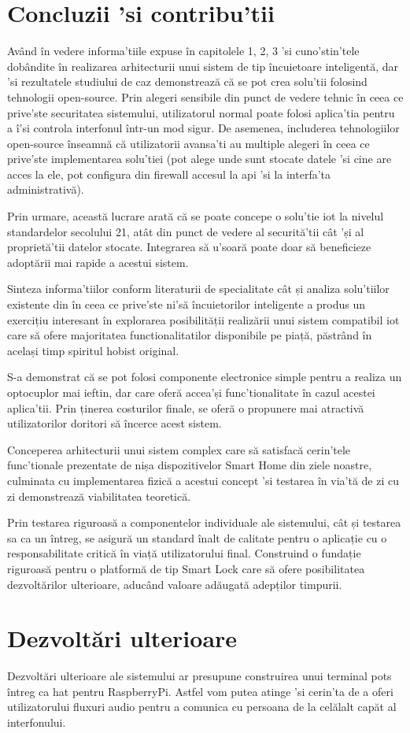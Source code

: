 \section{Concluzii 'si contribu'tii}

Având în vedere informa'tiile expuse în capitolele 1, 2, 3 'si cuno'stin'tele dobândite în realizarea arhitecturii unui sistem de tip încuietoare inteligentă, dar 'si rezultatele studiului de caz demonstrează că se pot crea solu'tii folosind tehnologii open-source. Prin alegeri sensibile din punct de vedere tehnic în ceea ce prive'ste securitatea sistemului, utilizatorul normal poate folosi aplica'tia pentru a î'si controla interfonul într-un mod sigur. De asemenea, includerea tehnologiilor open-source înseamnă că utilizatorii avansa'ti au multiple alegeri în ceea ce prive'ste implementarea solu'tiei (pot alege unde sunt stocate datele 'si cine are acces la ele, pot configura din firewall accesul la \acrshort{api} 'si la interfa'ta administrativă).

Prin urmare, această lucrare arată că se poate concepe o solu'tie \acrshort{iot} la nivelul standardelor secolului 21, atât din punct de vedere al securită'tii cât 'și al proprietă'tii datelor stocate. Integrarea să u'soară poate doar să beneficieze adoptării mai rapide a acestui sistem.

Sinteza informa'tiilor conform literaturii de specialitate cât și analiza solu'tiilor existente din în ceea ce prive'ste ni'să încuietorilor inteligente a produs un exercițiu interesant în explorarea posibilității realizării unui sistem compatibil \acrshort{iot} care să ofere majoritatea functionalitatilor disponibile pe piață, păstrând în același timp spiritul hobist original.

S-a demonstrat că se pot folosi componente electronice simple pentru a realiza un optocuplor mai ieftin, dar care oferă accea'și func'tionalitate în cazul acestei aplica'tii. Prin ținerea costurilor finale, se oferă o propunere mai atractivă utilizatorilor doritori să încerce acest sistem.

Conceperea arhitecturii unui sistem complex care să satisfacă cerin'tele func'tionale prezentate de nișa dispozitivelor Smart Home din ziele noastre, culminata cu implementarea fizică a acestui concept 'si testarea în via'tă de zi cu zi demonstrează viabilitatea teoretică.

Prin testarea riguroasă a componentelor individuale ale sistemului, cât și testarea sa ca un întreg, se asigură un standard înalt de calitate pentru o aplicație cu o responsabilitate critică în viață utilizatorului final. Construind o fundație riguroasă pentru o platformă de tip Smart Lock care să ofere posibilitatea dezvoltărilor ulterioare, aducând valoare adăugată adepților timpurii.

\section{Dezvoltări ulterioare}

Dezvoltări ulterioare ale sistemului ar presupune construirea unui terminal \acrshort{pots} întreg ca \acrshort{hat} pentru RaspberryPi. Astfel vom putea atinge 'si cerin'ta de a oferi utilizatorului fluxuri audio pentru a comunica cu persoana de la celălalt capăt al interfonului. 